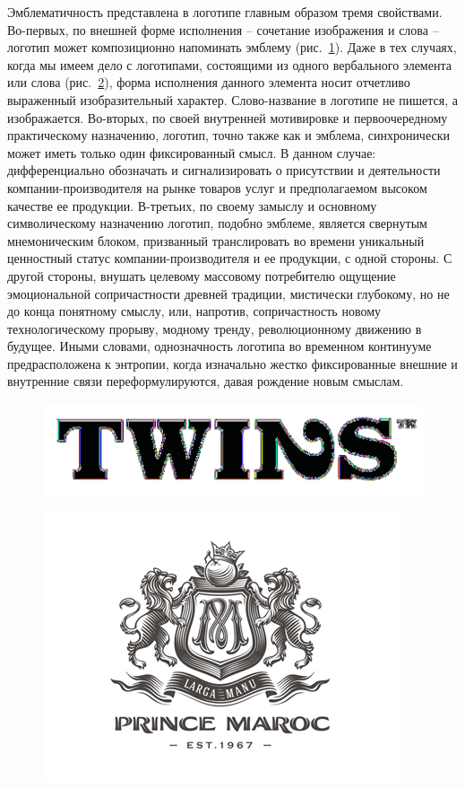 Эмблематичность представлена в логотипе главным образом тремя свойствами. Во-первых, по внешней
форме исполнения -- сочетание изображения и слова -- логотип может композиционно напоминать
эмблему (рис.~\ref{fig:twins}). Даже в тех случаях, когда мы имеем дело с логотипами, состоящими из
одного вербального элемента или слова (рис.~\ref{fig:maroc}), форма исполнения данного элемента
носит отчетливо выраженный изобразительный характер. Слово-название в логотипе не пишется, а
изображается. Во-вторых, по своей внутренней мотивировке и первоочередному практическому назначению,
логотип, точно также как и эмблема, синхронически может иметь только один фиксированный смысл. В
данном случае: дифференциально обозначать и сигнализировать о присутствии и деятельности
компании-производителя на рынке товаров услуг и предполагаемом высоком качестве ее
продукции. В-третьих, по своему замыслу и основному символическому назначению логотип, подобно
эмблеме, является свернутым мнемоническим блоком, призванный транслировать во времени уникальный
ценностный статус компании-производителя и ее продукции, с одной стороны.  С другой стороны, внушать
целевому массовому потребителю ощущение эмоциональной сопричастности древней традиции, мистически
глубокому, но не до конца понятному смыслу, или, напротив, сопричастность новому технологическому
прорыву, модному тренду, революционному движению в будущее.  Иными словами, однозначность логотипа
во временном континууме предрасположена к энтропии, когда изначально жестко фиксированные внешние и
внутренние связи переформулируются, давая рождение новым смыслам.

\begin{figure}[h!]
  \centering
  \includegraphics[width=.5\linewidth]{images/twins}
  \caption{}  %
  \label{fig:twins}
\end{figure}

\begin{figure}[h!]
  \centering
  \includegraphics[width=.5\linewidth]{images/maroc}
  \caption{}  %
  \label{fig:maroc}
\end{figure}

